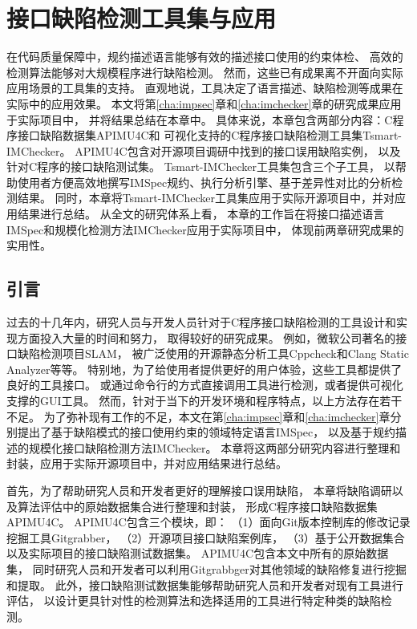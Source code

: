 \chapter{接口缺陷检测工具集与应用}
\label{cha:tools}
在代码质量保障中，规约描述语言能够有效的描述接口使用的约束体检、
高效的检测算法能够对大规模程序进行缺陷检测。
然而，这些已有成果离不开面向实际应用场景的工具集的支持。
直观地说，工具决定了语言描述、缺陷检测等成果在实际中的应用效果。
本文将第\ref{cha:impsec}章和\ref{cha:imchecker}章的研究成果应用于实际项目中，
并将结果总结在本章中。
具体来说，本章包含两部分内容：C程序接口缺陷数据集APIMU4C和
可视化支持的C程序接口缺陷检测工具集Tsmart-IMChecker。
APIMU4C包含对开源项目调研中找到的接口误用缺陷实例，
以及针对C程序的接口缺陷测试集。
Tsmart-IMChecker工具集包含三个子工具，
以帮助使用者方便高效地撰写IMSpec规约、执行分析引擎、基于差异性对比的分析检测结果。
同时，本章将Tsmart-IMChecker工具集应用于实际开源项目中，并对应用结果进行总结。
从全文的研究体系上看，
本章的工作旨在将接口描述语言IMSpec和规模化检测方法IMChecker应用于实际项目中，
体现前两章研究成果的实用性。

\section{引言}
过去的十几年内，研究人员与开发人员针对于C程序接口缺陷检测的工具设计和实现方面投入大量的时间和努力，
取得较好的研究成果。
例如，微软公司著名的接口缺陷检测项目SLAM，
被广泛使用的开源静态分析工具Cppcheck和Clang Static Analyzer等等。
特别地，为了给使用者提供更好的用户体验，这些工具都提供了良好的工具接口。
或通过命令行的方式直接调用工具进行检测，或者提供可视化支撑的GUI工具。
然而，针对于当下的开发环境和程序特点，以上方法存在若干不足。
为了弥补现有工作的不足，本文在第\ref{cha:impsec}章和\ref{cha:imchecker}章分别提出了基于缺陷模式的接口使用约束的领域特定语言IMSpec，
以及基于规约描述的规模化接口缺陷检测方法IMChecker。
本章将这两部分研究内容进行整理和封装，应用于实际开源项目中，并对应用结果进行总结。

首先，为了帮助研究人员和开发者更好的理解接口误用缺陷，
本章将缺陷调研以及算法评估中的原始数据集合进行整理和封装，
形成C程序接口缺陷数据集APIMU4C。
APIMU4C包含三个模块，即：
（1）面向Git版本控制库的修改记录挖掘工具Gitgrabber，
（2）开源项目接口缺陷案例库，
（3）基于公开数据集合以及实际项目的接口缺陷测试数据集。
APIMU4C包含本文中所有的原始数据集，
同时研究人员和开发者可以利用Gitgrabbger对其他领域的缺陷修复进行挖掘和提取。
此外，接口缺陷测试数据集能够帮助研究人员和开发者对现有工具进行评估，
以设计更具针对性的检测算法和选择适用的工具进行特定种类的缺陷检测。


